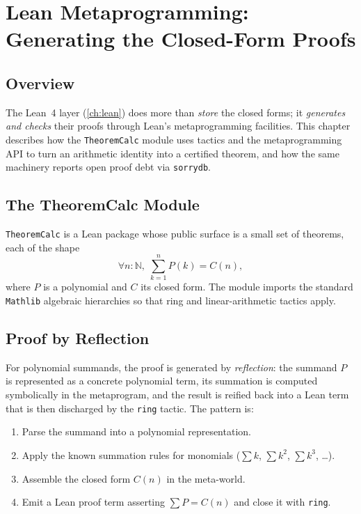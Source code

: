 \chapter{Lean Metaprogramming: Generating the Closed-Form Proofs}
\label{ch:lean-meta}

\section{Overview}
\label{sec:meta-ov}

The Lean~4 layer (\cref{ch:lean}) does more than \emph{store} the closed
forms; it \emph{generates and checks} their proofs through Lean's
metaprogramming facilities. This chapter describes how the
\texttt{TheoremCalc} module uses tactics and the metaprogramming API to
turn an arithmetic identity into a certified theorem, and how the same
machinery reports open proof debt via \texttt{sorrydb}.

\section{The TheoremCalc Module}
\label{sec:meta-module}

\texttt{TheoremCalc} is a Lean package whose public surface is a small set
of theorems, each of the shape
\[
\forall n:\mathbb{N},\; \sum_{k=1}^{n} P(k) = C(n),
\]
where $P$ is a polynomial and $C$ its closed form. The module imports the
standard \texttt{Mathlib} algebraic hierarchies so that ring and
linear-arithmetic tactics apply.

\section{Proof by Reflection}
\label{sec:meta-reflect}

For polynomial summands, the proof is generated by \emph{reflection}: the
summand $P$ is represented as a concrete polynomial term, its summation is
computed symbolically in the metaprogram, and the result is reified back
into a Lean term that is then discharged by the \texttt{ring} tactic. The
pattern is:
\begin{enumerate}
  \item Parse the summand into a polynomial representation.
  \item Apply the known summation rules for monomials
        ($\sum k$, $\sum k^2$, $\sum k^3$, \dots).
  \item Assemble the closed form $C(n)$ in the meta-world.
  \item Emit a Lean proof term asserting
        $\sum P = C(n)$ and close it with \texttt{ring}.
\end{enumerate}

